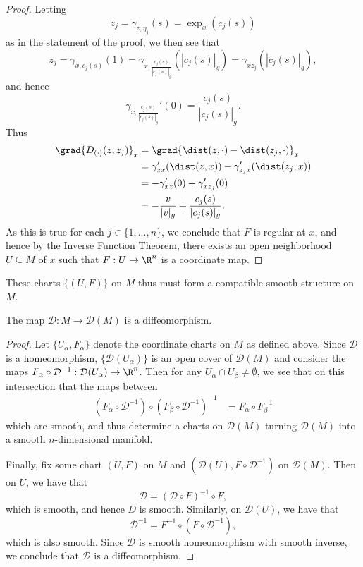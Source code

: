 \begin{proof}
Letting 
$$z_j=\gamma_{z,\eta_j}(s)=\exp_x(c_j(s))$$
as in the statement of the proof, we then see that
$$z_j=\gamma_{x,c_j(s)}(1)=\gamma_{x,\frac{c_j(s)}{|c_j(s)|_g}}(|c_j(s)|_g)=\gamma_{xz_j}(|c_j(s)|_g),$$
and hence
$$\gamma_{x,\frac{c_j(s)}{|c_j(s)|_g}}'(0)=\frac{c_j(s)}{|c_j(s)|_g}.$$
Thus
\begin{align*}
	\grad{D_{(\cdot)}(z,z_j)}_x&=\grad{\dist(z,\cdot)-\dist(z_j,\cdot)}_x\\
	&=\gamma_{zx}'(\dist(z,x))-\gamma'_{z_jx}(\dist(z_j,x))\\
	&=-\gamma_{xz}'(0)+\gamma_{xz_j}'(0)\\
	&=-\frac{v}{|v|_g}+\frac{c_j(s)}{|c_j(s)|_g}.
\end{align*}
As this is true for each $j\in\{1,...,n\}$, we conclude that $F$ is regular at $x$, and hence by the Inverse Function Theorem, there exists an open neighborhood $U\subseteq M$ of $x$ such that $F:U\to\R^n$ is a coordinate map.
\end{proof}

These charts $\{(U,F)\}$ on $M$ thus must form a compatible smooth structure on $M$.

\begin{thm}
    The map $\mathcal{D}:M\to\mathcal{D}(M)$ is a diffeomorphism.
\end{thm}

\begin{proof}
Let $\{U_\alpha,F_\alpha\}$ denote the coordinate charts on $M$ as defined above.  Since $\mathcal{D}$ is a homeomorphism, $\{\mathcal{D}(U_\alpha)\}$ is an open cover of $\mathcal{D}(M)$ and consider the maps $F_\alpha\circ\mathcal{D}^{-1}:\mathcal{D}(U_\alpha)\to\R^n$.  Then for any $U_\alpha\cap U_\beta\neq\emptyset$, we see that on this intersection that the maps between
\begin{align*}
	(F_\alpha\circ\mathcal{D}^{-1})\circ(F_\beta\circ\mathcal{D}^{-1})^{-1}&=F_\alpha\circ F_\beta^{-1}
\end{align*}
which are smooth, and thus determine a charts on $\mathcal{D}(M)$ turning $\mathcal{D}(M)$ into a smooth $n$-dimensional manifold.

Finally, fix some chart $(U,F)$ on $M$ and $(\mathcal{D}(U),F\circ\mathcal{D}^{-1})$ on $\mathcal{D}(M)$.  Then on $U$, we have that
$$\mathcal{D}=(\mathcal{D}\circ F)^{-1}\circ F,$$
which is smooth, and hence $D$ is smooth.  Similarly, on $\mathcal{D}(U)$, we have that
$$\mathcal{D}^{-1}=F^{-1}\circ(F\circ\mathcal{D}^{-1}),$$
which is also smooth.  Since $\mathcal{D}$ is smooth homeomorphism with smooth inverse, we conclude that $\mathcal{D}$ is a diffeomorphism.
\end{proof}






